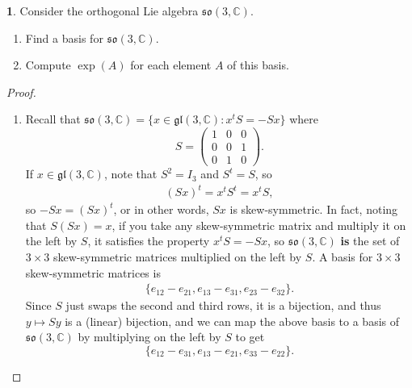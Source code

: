 \documentclass[12pt]{article}
\newcommand{\gl}{\mathfrak{gl}}
\newcommand{\so}{\mathfrak{so}}
\theoremstyle{definition}
\newtheorem{ex}{}
\begin{document}
\begin{ex}
	Consider the orthogonal Lie algebra $\so(3, \mathbb{C})$.
	\begin{enumerate}[label=(\alph*)]
		\item Find a basis for $\so(3, \mathbb{C})$.
		\item Compute $\exp(A)$ for each element $A$ of this basis.
	\end{enumerate}
\end{ex}
\begin{proof}\
	\begin{enumerate}[label=(\alph*)]
		\item Recall that $\so(3, \mathbb{C}) = \lbrace x \in \gl(3, \mathbb{C}) : x^tS = -Sx \rbrace$ where \begin{equation*}
			      S = \begin{pmatrix} 1 & 0 & 0 \\ 0 & 0 & 1 \\ 0 & 1 & 0 \end{pmatrix}.
		      \end{equation*}
		      If $x \in \gl(3, \mathbb{C})$, note that $S^2 = I_3$ and $S^t = S$, so \begin{align*}
			      (Sx)^t = x^tS^t = x^tS,
		      \end{align*}
		      so $-Sx = (Sx)^t$, or in other words, $Sx$ is skew-symmetric.
		      In fact, noting that $S(Sx) = x$, if you take any skew-symmetric matrix and multiply it on the left by $S$, it satisfies the property $x^tS = -Sx$, so $\so(3, \mathbb{C})$ \textbf{is} the set of $3 \times 3$ skew-symmetric matrices multiplied on the left by $S$.
		      A basis for $3 \times 3$ skew-symmetric matrices is \begin{align*}
			      \lbrace e_{12} - e_{21}, e_{13} - e_{31}, e_{23} - e_{32} \rbrace.
		      \end{align*}
		      Since $S$ just swaps the second and third rows, it is a bijection, and thus $y \mapsto Sy$ is a (linear) bijection, and we can map the above basis to a basis of $\so(3, \mathbb{C})$ by multiplying on the left by $S$ to get \begin{equation*}
			      \lbrace e_{12} - e_{31}, e_{13} - e_{21}, e_{33} - e_{22} \rbrace.
		      \end{equation*}


\end{enumerate}
\end{proof}
\end{document}
